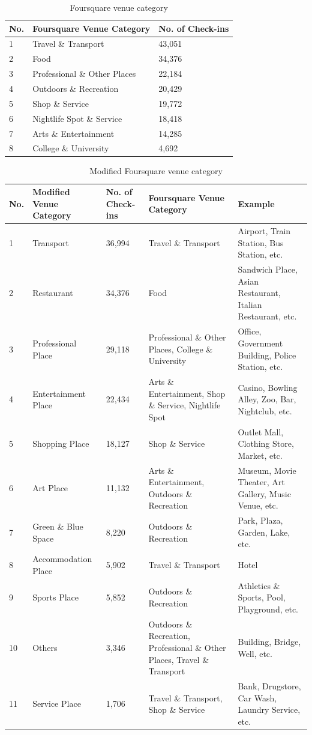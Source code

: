 \documentclass{article}
\begin{document}
\begin{table}
\centering
\caption{\label{tab:foursquare_category}Foursquare venue category}
\begin{tabular}{lll} \hline
No. & Foursquare Venue Category & No. of Check-ins \\ \hline
1 & Travel \& Transport & 43,051 \\
2 & Food & 34,376 \\
3 & Professional \& Other Places & 22,184 \\
4 & Outdoors \& Recreation & 20,429 \\
5 & Shop \& Service & 19,772 \\
6 & Nightlife Spot \& Service & 18,418 \\
7 & Arts \& Entertainment & 14,285 \\
8 & College \& University & 4,692 \\ \hline
\end{tabular}
\end{table}


\begin{table}
\centering
\caption{\label{tab:modified_category}Modified Foursquare venue category}
\begin{adjustbox}{max width=\textwidth, margin=0cm}
\begin{tabular}{lllp{6cm}p{5cm}} \hline
No. & Modified Venue Category & No. of Check-ins & Foursquare Venue Category 
& Example \\ \hline
1 & Transport & 36,994 & Travel \& Transport & Airport, Train Station, Bus Station, etc. \\
2 & Restaurant & 34,376 & Food & Sandwich Place, Asian Restaurant, Italian Restaurant, etc. \\
3 & Professional Place & 29,118 & Professional \& Other Places, College \& University & Office, Government Building, Police Station, etc. \\
4 & Entertainment Place & 22,434 & Arts \& Entertainment, Shop \& Service, Nightlife Spot & Casino, Bowling Alley, Zoo, Bar, Nightclub, etc. \\
5 & Shopping Place & 18,127 & Shop \& Service & Outlet Mall, Clothing Store, Market, etc. \\
6 & Art Place & 11,132 & Arts \& Entertainment, Outdoors \& Recreation & Museum, Movie Theater, Art Gallery, Music Venue, etc. \\
7 & Green \& Blue Space & 8,220 & Outdoors \& Recreation & Park, Plaza, Garden, Lake, etc. \\
8 & Accommodation Place & 5,902 & Travel \& Transport & Hotel \\
9 & Sports Place & 5,852 & Outdoors \& Recreation & Athletics \& Sports, Pool, Playground, etc. \\
10 & Others & 3,346 & Outdoors \& Recreation, Professional \& Other Places, Travel \& Transport & Building, Bridge, Well, etc. \\
11 & Service Place & 1,706 & Travel \& Transport, Shop \& Service & Bank, Drugstore, Car Wash, Laundry Service, etc. \\ \hline
\end{tabular}
\end{adjustbox}
\end{table}
\end{document}
